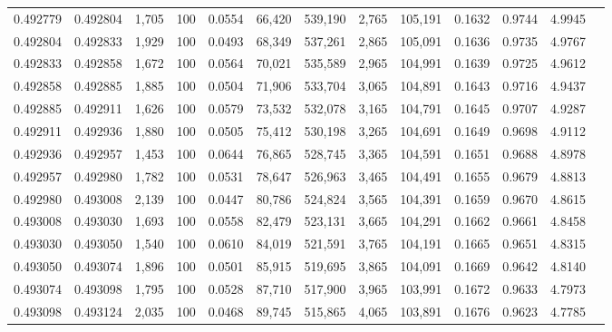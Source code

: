\begin{tabular}{rrrrrrrrrrrrr}
0.492779 & 0.492804 & 1,705 & 100 &                                     0.0554 &  66,420 & 539,190 &   2,765 & 105,191 & 0.1632 & 0.9744 & 4.9945 \\
0.492804 & 0.492833 & 1,929 & 100 &                                     0.0493 &  68,349 & 537,261 &   2,865 & 105,091 & 0.1636 & 0.9735 & 4.9767 \\
0.492833 & 0.492858 & 1,672 & 100 &                                     0.0564 &  70,021 & 535,589 &   2,965 & 104,991 & 0.1639 & 0.9725 & 4.9612 \\
0.492858 & 0.492885 & 1,885 & 100 &                                     0.0504 &  71,906 & 533,704 &   3,065 & 104,891 & 0.1643 & 0.9716 & 4.9437 \\
0.492885 & 0.492911 & 1,626 & 100 &                                     0.0579 &  73,532 & 532,078 &   3,165 & 104,791 & 0.1645 & 0.9707 & 4.9287 \\
0.492911 & 0.492936 & 1,880 & 100 &                                     0.0505 &  75,412 & 530,198 &   3,265 & 104,691 & 0.1649 & 0.9698 & 4.9112 \\
0.492936 & 0.492957 & 1,453 & 100 &                                     0.0644 &  76,865 & 528,745 &   3,365 & 104,591 & 0.1651 & 0.9688 & 4.8978 \\
0.492957 & 0.492980 & 1,782 & 100 &                                     0.0531 &  78,647 & 526,963 &   3,465 & 104,491 & 0.1655 & 0.9679 & 4.8813 \\
0.492980 & 0.493008 & 2,139 & 100 &                                     0.0447 &  80,786 & 524,824 &   3,565 & 104,391 & 0.1659 & 0.9670 & 4.8615 \\
0.493008 & 0.493030 & 1,693 & 100 &                                     0.0558 &  82,479 & 523,131 &   3,665 & 104,291 & 0.1662 & 0.9661 & 4.8458 \\
0.493030 & 0.493050 & 1,540 & 100 &                                     0.0610 &  84,019 & 521,591 &   3,765 & 104,191 & 0.1665 & 0.9651 & 4.8315 \\
0.493050 & 0.493074 & 1,896 & 100 &                                     0.0501 &  85,915 & 519,695 &   3,865 & 104,091 & 0.1669 & 0.9642 & 4.8140 \\
0.493074 & 0.493098 & 1,795 & 100 &                                     0.0528 &  87,710 & 517,900 &   3,965 & 103,991 & 0.1672 & 0.9633 & 4.7973 \\
0.493098 & 0.493124 & 2,035 & 100 &                                     0.0468 &  89,745 & 515,865 &   4,065 & 103,891 & 0.1676 & 0.9623 & 4.7785 \\

\end{tabular}
